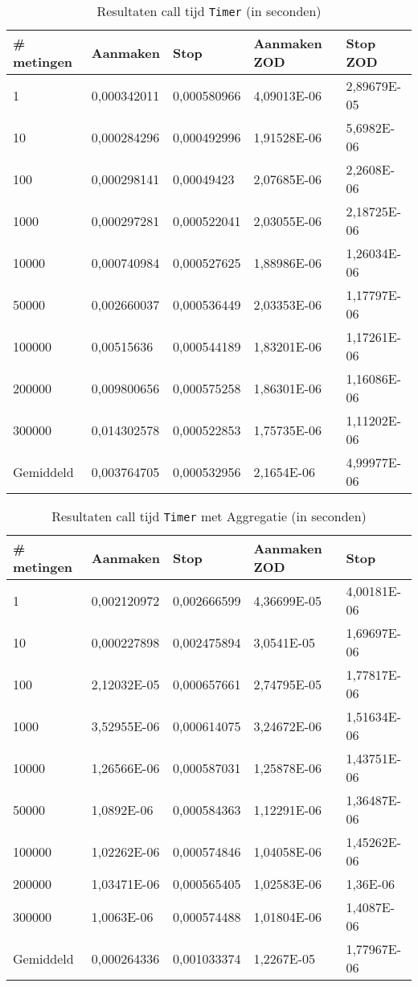 \begin{table}[]
\centering
\begin{tabular}{|l|l|l|l|l|}
\hline
\# metingen   & Aanmaken    & Stop        & Aanmaken ZOD & Stop ZOD    \\ \hline
1         & 0,000342011 & 0,000580966 & 4,09013E-06  & 2,89679E-05 \\ \hline
10        & 0,000284296 & 0,000492996 & 1,91528E-06  & 5,6982E-06  \\ \hline
100       & 0,000298141 & 0,00049423  & 2,07685E-06  & 2,2608E-06  \\ \hline
1000      & 0,000297281 & 0,000522041 & 2,03055E-06  & 2,18725E-06 \\ \hline
10000     & 0,000740984 & 0,000527625 & 1,88986E-06  & 1,26034E-06 \\ \hline
50000     & 0,002660037 & 0,000536449 & 2,03353E-06  & 1,17797E-06 \\ \hline
100000    & 0,00515636  & 0,000544189 & 1,83201E-06  & 1,17261E-06 \\ \hline
200000    & 0,009800656 & 0,000575258 & 1,86301E-06  & 1,16086E-06 \\ \hline
300000    & 0,014302578 & 0,000522853 & 1,75735E-06  & 1,11202E-06 \\ \hline
Gemiddeld & 0,003764705 & 0,000532956 & 2,1654E-06   & 4,99977E-06 \\ \hline
\end{tabular}
\caption{Resultaten call tijd \texttt{Timer} (in seconden)}
\label{Table:Timer}
\end{table}

\begin{table}[]
\centering
\begin{tabular}{|l|l|l|l|l|}
\hline
\# metingen & Aanmaken    & Stop        & Aanmaken ZOD & Stop        \\ \hline
1           & 0,002120972 & 0,002666599 & 4,36699E-05  & 4,00181E-06 \\ \hline
10          & 0,000227898 & 0,002475894 & 3,0541E-05   & 1,69697E-06 \\ \hline
100         & 2,12032E-05 & 0,000657661 & 2,74795E-05  & 1,77817E-06 \\ \hline
1000        & 3,52955E-06 & 0,000614075 & 3,24672E-06  & 1,51634E-06 \\ \hline
10000       & 1,26566E-06 & 0,000587031 & 1,25878E-06  & 1,43751E-06 \\ \hline
50000       & 1,0892E-06  & 0,000584363 & 1,12291E-06  & 1,36487E-06 \\ \hline
100000      & 1,02262E-06 & 0,000574846 & 1,04058E-06  & 1,45262E-06 \\ \hline
200000      & 1,03471E-06 & 0,000565405 & 1,02583E-06  & 1,36E-06    \\ \hline
300000      & 1,0063E-06  & 0,000574488 & 1,01804E-06  & 1,4087E-06  \\ \hline
Gemiddeld   & 0,000264336 & 0,001033374 & 1,2267E-05   & 1,77967E-06 \\ \hline
\end{tabular}
\caption{Resultaten call tijd \texttt{Timer} met Aggregatie (in seconden)}
\label{Table:TimerAggregate}
\end{table}

